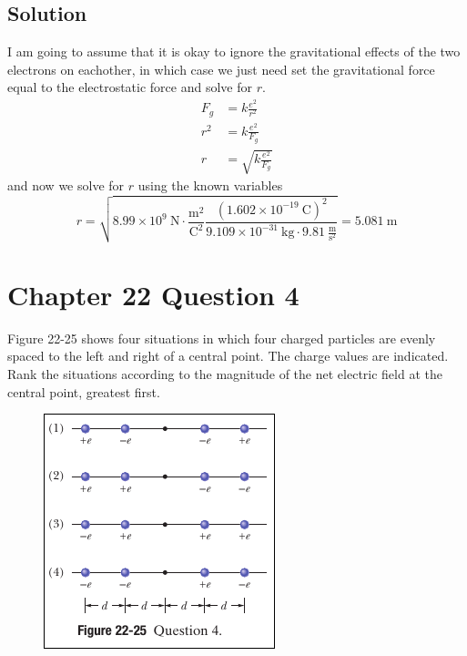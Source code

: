 \documentclass{article}
\newcommand{\g}{\text{g}}
\newcommand{\kilo}{\text{k}}
\newcommand{\m}{\text{m}}
\newcommand{\s}{\text{s}}
\newcommand{\N}{\text{N}}
\newcommand{\C}{\text{C}}
\begin{document}
\subsection*{Solution}
I am going to assume that it is okay to ignore the gravitational effects of the two electrons on eachother, in which case we just need set the gravitational force equal to the electrostatic force and solve for $r$.
\begin{align*}
	F_g &= k\frac{e^2}{r^2} \\
	r^2 &= k\frac{e^2}{F_g} \\
	r &= \sqrt{k \frac{e^2}{F_g}}
\end{align*}
and now we solve for $r$ using the known variables
\[
	r = \sqrt{8.99 \times 10^9\ \N \cdot \frac{\m^2}{\C^2} \frac{(1.602 \times 10^{-19}\ \C)^2}{9.109 \times 10^{-31}\ \kilo\g \cdot 9.81\ \frac{\m}{\s^2}}} = \boxed{5.081\ \m} 
\]

\section*{Chapter 22 Question 4}
Figure 22-25 shows four situations in which four charged particles are evenly spaced to the left and right of a central point. 
The charge values are indicated. 
Rank the situations according to the magnitude of the net electric field at the central point, greatest first.

\begin{figure}[ht]
    \centering
    \includegraphics[scale=0.75]{image-1.png}
\end{figure}
\end{document}

